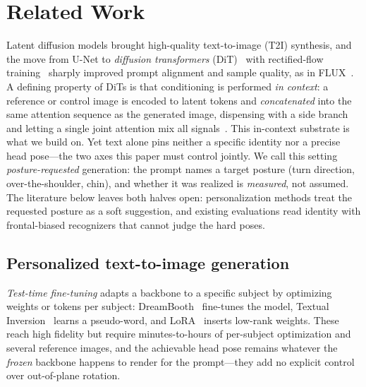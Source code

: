 \chapter{Related Work}
\label{sec:related}

Latent diffusion models brought high-quality text-to-image (T2I) synthesis, and the move from U-Net to \emph{diffusion transformers} (DiT)~\cite{dit,sd3} with rectified-flow training~\cite{rectifiedflow,flowmatching} sharply improved prompt alignment and sample quality, as in FLUX~\cite{flux}. A defining property of DiTs is that conditioning is performed \emph{in context}: a reference or control image is encoded to latent tokens and \emph{concatenated} into the same attention sequence as the generated image, dispensing with a side branch and letting a single joint attention mix all signals~\cite{ominicontrol,fluxkontext}. This in-context substrate is what we build on. Yet text alone pins neither a specific identity nor a precise head pose---the two axes this paper must control jointly. We call this setting \emph{posture-requested} generation: the prompt names a target posture (turn direction, over-the-shoulder, chin), and whether it was realized is \emph{measured}, not assumed. The literature below leaves both halves open: personalization methods treat the requested posture as a soft suggestion, and existing evaluations read identity with frontal-biased recognizers that cannot judge the hard poses.

\section{Personalized text-to-image generation}
\emph{Test-time fine-tuning} adapts a backbone to a specific subject by optimizing weights or tokens per subject: DreamBooth~\cite{dreambooth} fine-tunes the model, Textual Inversion~\cite{textinv} learns a pseudo-word, and LoRA~\cite{lora} inserts low-rank weights. These reach high fidelity but require minutes-to-hours of per-subject optimization and several reference images, and the achievable head pose remains whatever the \emph{frozen} backbone happens to render for the prompt---they add no explicit control over out-of-plane rotation.


